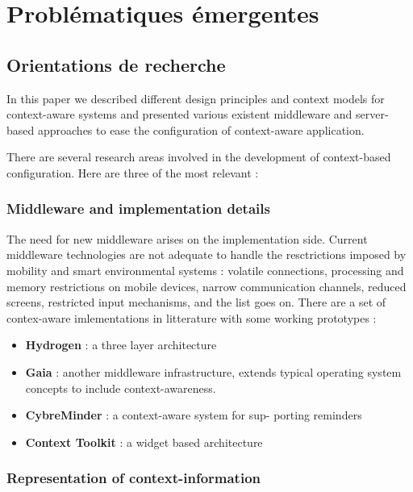 \chapter{Problématiques émergentes}

\section{Orientations de recherche}

In this paper we described different design principles and context models for
context-aware systems and presented various existent middleware and
server-based approaches to ease the configuration of context-aware application.

There are several research areas involved in the development of context-based
configuration. Here are three of the most relevant :

\subsection{Middleware and implementation details}

The need for new middleware arises on the implementation side. Current
middleware technologies are not adequate to handle the resctrictions imposed by
mobility and smart environmental systems : volatile connections, processing and
memory restrictions on mobile devices, narrow communication channels, reduced
screens, restricted input mechanisms, and the list goes on. There are a set of 
contex-aware imlementations in litterature with some working prototypes :

\begin{itemize}
    \item \textbf{Hydrogen} \cite{Hofer2002}: a three layer architecture
    \item \textbf{Gaia} \cite{Chetan2005}: another middleware infrastructure,
    extends typical operating system concepts to include context-awareness.
    \item \textbf{CybreMinder} \cite{Abowd2002}: a context-aware system for sup-
    porting reminders
    \item \textbf{Context Toolkit} \cite{Dey2001}: a widget based architecture
\end{itemize}

\subsection{Representation of context-information}

